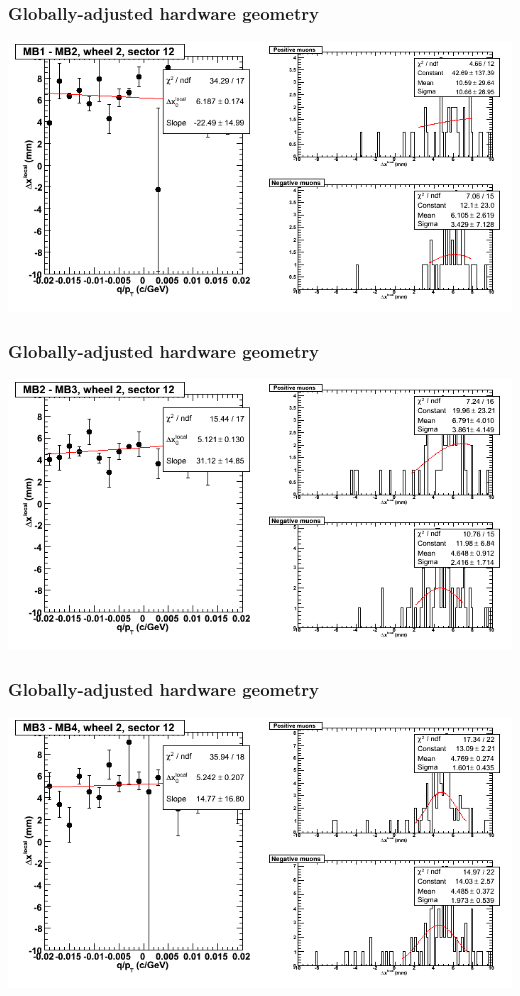 \documentclass[compress]{beamer}
\begin{document}
\begin{frame}
\frametitle{Globally-adjusted hardware geometry}
\includegraphics[width=\linewidth]{NOV4_segdiffs_HW/dt13_resid_E_12_12.png}
\end{frame}

\begin{frame}
\frametitle{Globally-adjusted hardware geometry}
\includegraphics[width=\linewidth]{NOV4_segdiffs_HW/dt13_resid_E_12_23.png}
\end{frame}

\begin{frame}
\frametitle{Globally-adjusted hardware geometry}
\includegraphics[width=\linewidth]{NOV4_segdiffs_HW/dt13_resid_E_12_34.png}
\end{frame}
\end{document}
